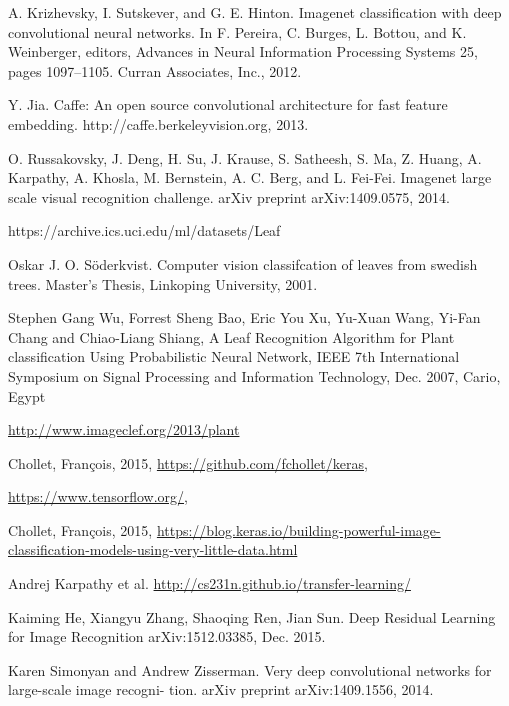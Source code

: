 \documentclass[journal, 10pt]{IEEEtran}
\begin{document}
\begin{thebibliography}{1}
    A. Krizhevsky, I. Sutskever, and G. E. Hinton. Imagenet classification with deep convolutional neural networks. In F. Pereira, C. Burges, L. Bottou, and K. Weinberger, editors, Advances in Neural Information Processing Systems 25, pages 1097–1105. Curran Associates, Inc., 2012.

    Y. Jia. Caffe: An open source convolutional architecture for fast feature embedding. http://caffe.berkeleyvision.org, 2013.

    O. Russakovsky, J. Deng, H. Su, J. Krause, S. Satheesh, S. Ma, Z. Huang, A. Karpathy, A. Khosla, M. Bernstein, A. C. Berg, and L. Fei-Fei. Imagenet large scale visual recognition challenge. arXiv preprint arXiv:1409.0575, 2014.

    https://archive.ics.uci.edu/ml/datasets/Leaf

    Oskar J. O. Söderkvist. Computer vision classifcation of leaves from swedish trees. Master's Thesis, Linkoping University, 2001.

    Stephen Gang Wu, Forrest Sheng Bao, Eric You Xu, Yu-Xuan Wang, Yi-Fan Chang and Chiao-Liang Shiang, A Leaf Recognition Algorithm for Plant classification Using Probabilistic Neural Network, IEEE 7th International Symposium on Signal Processing and Information Technology, Dec. 2007, Cario, Egypt

    \url{http://www.imageclef.org/2013/plant}

    Chollet, Fran\c{c}ois, 2015, \url{https://github.com/fchollet/keras},

    \url{https://www.tensorflow.org/},

    Chollet, Fran\c{c}ois, 2015, \url{ https://blog.keras.io/building-powerful-image-classification-models-using-very-little-data.html}

    Andrej Karpathy et al. \url{http://cs231n.github.io/transfer-learning/}

    Kaiming He, Xiangyu Zhang, Shaoqing Ren, Jian Sun. Deep Residual Learning for Image Recognition 	arXiv:1512.03385, Dec. 2015.

    Karen Simonyan and Andrew Zisserman. Very deep convolutional networks for large-scale image recogni- tion. arXiv preprint arXiv:1409.1556, 2014.


\end{thebibliography}
\end{document}

